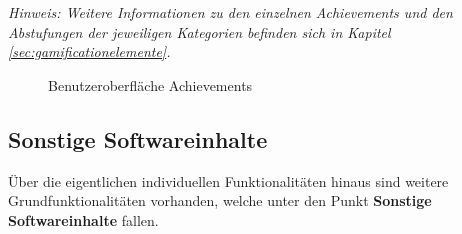 \documentclass[bibliography=totoc,listof=totoc,BCOR=5mm,DIV=12,oneside]{scrbook}
\begin{document}
\par \bigskip \textit{Hinweis: Weitere Informationen zu den einzelnen Achievements und den Abstufungen der jeweiligen Kategorien befinden sich in Kapitel \ref{sec:gamificationelemente}.}

\bigskip
\begin{figure}[H]
\centering
	\caption{Benutzeroberfläche Achievements}
	\label{img:achievements}
\end{figure}

\newpage
\subsection{Sonstige Softwareinhalte}
\par Über die eigentlichen individuellen Funktionalitäten hinaus sind weitere Grundfunktionalitäten vorhanden, welche unter den Punkt \textbf{Sonstige Softwareinhalte} fallen.
\end{document}
